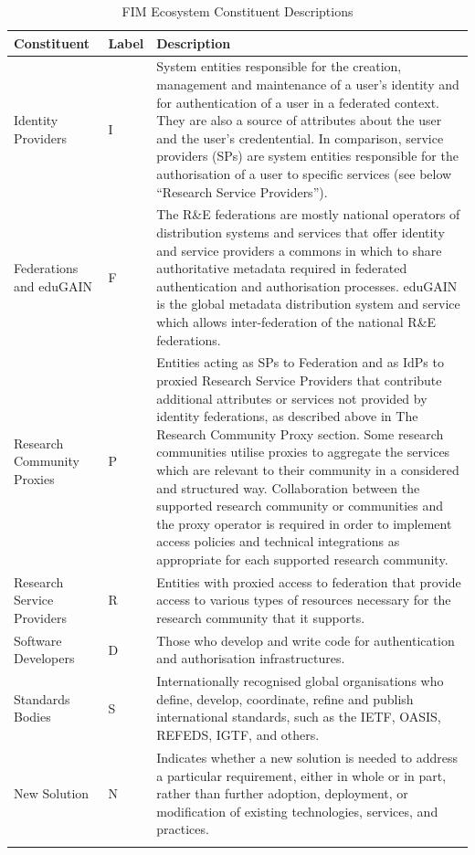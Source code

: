 \documentclass[fleqn,10pt]{wlscirep}
\begin{document}
{\begin{center}
\begin{longtable}{|p{3cm}|p{1cm}|p{10cm}|} 
\hline
Constituent
&Label
&Description \\
\hline\hline
\endhead
Identity Providers
&I
&System entities responsible for the creation, management and maintenance of a user’s identity and for authentication of a user in a federated context. They are also a source of attributes about the user and the user’s credentential. In comparison, service providers (SPs) are system entities responsible for the authorisation of a user to specific services (see below “Research Service Providers”).\\
\hline
Federations and eduGAIN
&F
&The R\&E federations are mostly national operators of distribution systems and services that offer identity and service providers a commons in which to share authoritative metadata required in federated authentication and authorisation processes. eduGAIN is the global metadata distribution system and service which allows inter-federation of the national R\&E federations. \\
\hline
Research Community Proxies
&P
&Entities acting as SPs to Federation and as IdPs to proxied Research Service Providers that contribute additional attributes or services not provided by identity federations, as described above in The Research Community Proxy section. Some research communities utilise proxies to aggregate the services which are relevant to their community in a considered and structured way. Collaboration between the supported research community or communities and the proxy operator is required in order to implement access policies and technical integrations as appropriate for each supported research community. \\
\hline
Research Service Providers
&R
&Entities with proxied access to federation that provide access to various types of resources necessary for the research community that it supports.\\
\hline
Software Developers
&D
&Those who develop and write code for authentication and authorisation infrastructures. \\
\hline
Standards Bodies
&S
&Internationally recognised global organisations who define, develop, coordinate, refine and publish international standards, such as the IETF, OASIS, REFEDS, IGTF, and others.\\
\hline
New Solution
&N
&Indicates whether a new solution is needed to address a particular requirement, either in whole or in part, rather than further adoption, deployment, or modification of existing technologies, services, and practices.\\
 \hline
\caption{FIM Ecosystem Constituent Descriptions}
\label{tab:ecosystem}
\end{longtable}
\end{center}

}
\end{document}
